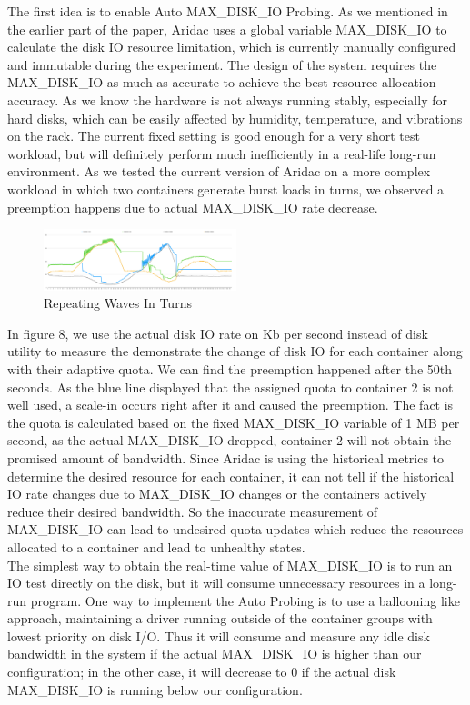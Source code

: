 \documentclass[10pt, conference,compsoc]{IEEEtran}
\begin{document}
The first idea is to enable Auto MAX\_DISK\_IO Probing. As we mentioned in the earlier part of the paper, Aridac uses a global variable MAX\_DISK\_IO to calculate the disk IO resource limitation, which is currently manually configured and immutable during the experiment. The design of the system requires the MAX\_DISK\_IO as much as accurate to achieve the best resource allocation accuracy. As we know the hardware is not always running stably, especially for hard disks, which can be easily affected by humidity, temperature, and vibrations on the rack. The current fixed setting is good enough for a very short test workload, but will definitely perform much inefficiently in a real-life long-run environment. As we tested the current version of Aridac on a more complex workload in which two containers generate burst loads in turns, we observed a preemption happens due to actual MAX\_DISK\_IO rate decrease.

\begin{figure}[h]
\centering
\includegraphics[width=0.5\textwidth]{images/workload3.png}
\caption{Repeating Waves In Turns}
\end{figure}

In figure 8, we use the actual disk IO rate on Kb per second instead of disk utility to measure the demonstrate the change of disk IO for each container along with their adaptive quota. We can find the preemption happened after the 50th seconds. As the blue line displayed that the assigned quota to container 2 is not well used, a scale-in occurs right after it and caused the preemption. The fact is the quota is calculated based on the fixed MAX\_DISK\_IO variable of 1 MB per second, as the actual MAX\_DISK\_IO dropped, container 2 will not obtain the promised amount of bandwidth. Since Aridac is using the historical metrics to determine the desired resource for each container, it can not tell if the historical IO rate changes due to MAX\_DISK\_IO changes or the containers actively reduce their desired bandwidth. So the inaccurate measurement of MAX\_DISK\_IO can lead to undesired quota updates which reduce the resources allocated to a container and lead to unhealthy states.\\

The simplest way to obtain the real-time value of MAX\_DISK\_IO is to run an IO test directly on the disk, but it will consume unnecessary resources in a long-run program. One way to implement the Auto Probing is to use a ballooning like approach, maintaining a driver running outside of the container groups with lowest priority on disk I/O. Thus it will consume and measure any idle disk bandwidth in the system if the actual MAX\_DISK\_IO is higher than our configuration; in the other case, it will decrease to 0 if the actual disk MAX\_DISK\_IO is running below our configuration.\\
\end{document}
